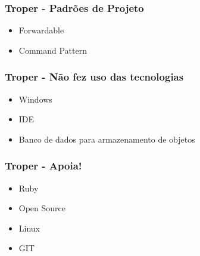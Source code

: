 \documentclass{beamer}
\begin{document}
\begin{frame}
\frametitle{Troper - Padrões de Projeto}
  \begin{itemize} 
    \item Forwardable
    \item Command Pattern 
  \end{itemize} 
\end{frame}

\begin{frame} 
\frametitle{Troper - Não fez uso das tecnologias }
  \begin{itemize} 
    \item Windows 
    \item IDE
    \item Banco de dados para armazenamento de objetos
  \end{itemize} 
\end{frame} 

\begin{frame} 
\frametitle{Troper - Apoia!}
  \begin{itemize} 
    \item Ruby 
    \item Open Source 
    \item Linux 
    \item GIT 
  \end{itemize} 
\end{frame} 
\end{document}
